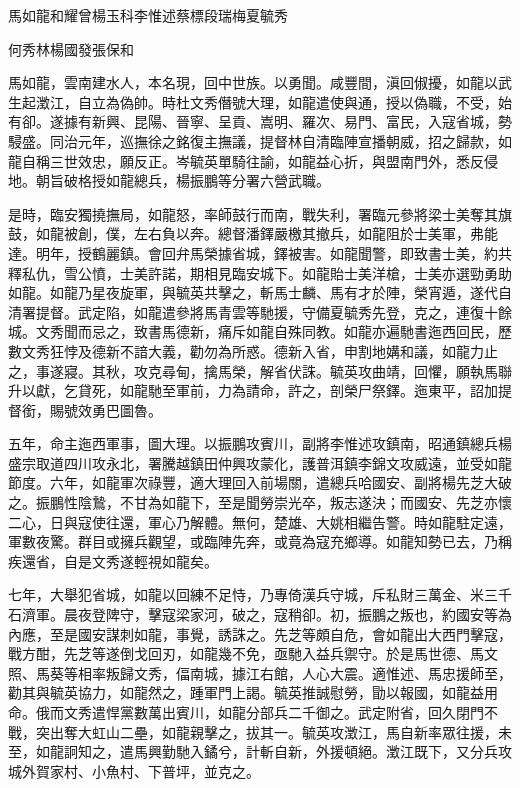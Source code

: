 
\begin{pinyinscope}
馬如龍和耀曾楊玉科李惟述蔡標段瑞梅夏毓秀

何秀林楊國發張保和

馬如龍，雲南建水人，本名現，回中世族。以勇聞。咸豐間，滇回俶擾，如龍以武生起澂江，自立為偽帥。時杜文秀僭號大理，如龍遣使與通，授以偽職，不受，始有卻。遂據有新興、昆陽、晉寧、呈貢、嵩明、羅次、易門、富民，入寇省城，勢駸盛。同治元年，巡撫徐之銘復主撫議，提督林自清臨陣宣播朝威，招之歸款，如龍自稱三世效忠，願反正。岑毓英單騎往諭，如龍益心折，與盟南門外，悉反侵地。朝旨破格授如龍總兵，楊振鵬等分署六營武職。

是時，臨安獨撓撫局，如龍怒，率師鼓行而南，戰失利，署臨元參將梁士美奪其旗鼓，如龍被創，僕，左右負以奔。總督潘鐸嚴檄其撤兵，如龍阻於士美軍，弗能達。明年，授鶴麗鎮。會回弁馬榮據省城，鐸被害。如龍聞警，即致書士美，約共釋私仇，雪公憤，士美許諾，期相見臨安城下。如龍貽士美洋槍，士美亦選勁勇助如龍。如龍乃星夜旋軍，與毓英共擊之，斬馬士麟、馬有才於陣，榮宵遁，遂代自清署提督。武定陷，如龍遣參將馬青雲等馳援，守備夏毓秀先登，克之，連復十餘城。文秀聞而忌之，致書馬德新，痛斥如龍自殊同教。如龍亦遍馳書迤西回民，歷數文秀狂悖及德新不諳大義，勸勿為所惑。德新入省，申割地媾和議，如龍力止之，事遂寢。其秋，攻克尋甸，擒馬榮，解省伏誅。毓英攻曲靖，回懼，願執馬聯升以獻，乞貸死，如龍馳至軍前，力為請命，許之，剖榮尸祭鐸。迤東平，詔加提督銜，賜號效勇巴圖魯。

五年，命主迤西軍事，圖大理。以振鵬攻賓川，副將李惟述攻鎮南，昭通鎮總兵楊盛宗取道四川攻永北，署騰越鎮田仲興攻蒙化，護普洱鎮李錦文攻威遠，並受如龍節度。六年，如龍軍次祿豐，適大理回入前場關，遣總兵哈國安、副將楊先芝大破之。振鵬性陰鷙，不甘為如龍下，至是聞勞崇光卒，叛志遂決；而國安、先芝亦懷二心，日與寇使往還，軍心乃解體。無何，楚雄、大姚相繼告警。時如龍駐定遠，軍數夜驚。群目或擁兵觀望，或臨陣先奔，或竟為寇充鄉導。如龍知勢已去，乃稱疾還省，自是文秀遂輕視如龍矣。

七年，大舉犯省城，如龍以回練不足恃，乃專倚漢兵守城，斥私財三萬金、米三千石濟軍。晨夜登陴守，擊寇梁家河，破之，寇稍卻。初，振鵬之叛也，約國安等為內應，至是國安謀刺如龍，事覺，誘誅之。先芝等頗自危，會如龍出大西門擊寇，戰方酣，先芝等遂倒戈回刃，如龍幾不免，亟馳入益兵禦守。於是馬世德、馬文照、馬葵等相率叛歸文秀，偪南城，據江右館，人心大震。適惟述、馬忠援師至，勸其與毓英協力，如龍然之，踵軍門上謁。毓英推誠慰勞，勖以報國，如龍益用命。俄而文秀遣悍黨數萬出賓川，如龍分部兵二千御之。武定附省，回久閉門不戰，突出奪大虹山二壘，如龍親擊之，拔其一。毓英攻澂江，馬自新率眾往援，未至，如龍詗知之，遣馬興勤馳入鐍兮，計斬自新，外援頓絕。澂江既下，又分兵攻城外賀家村、小魚村、下普坪，並克之。


\end{pinyinscope}
